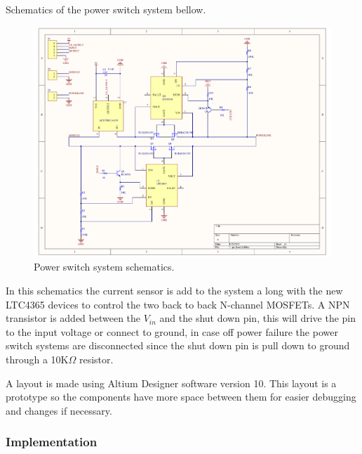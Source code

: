 Schematics of the power switch system bellow.
\begin{figure}[H]
	\begin{centering}
		\includegraphics[width=1.0\textwidth]{images/PS_PCB.pdf}
		\caption{Power switch system schematics.}
	\end{centering}
\end{figure}
In this schematics the current sensor is add to the system a long with the new LTC4365 devices to control the two back to back N-channel MOSFETs. A NPN transistor is added between the $ V_{in} $ and the shut down pin, this will drive the pin to the input voltage or connect to ground, in case off power failure the power switch systems are disconnected since the shut down pin is pull down to ground through a 10K$ \Omega $ resistor.

A layout is made using Altium Designer software version 10. This layout is a prototype so the components have more space between them for easier debugging and changes if necessary.
\begin{figure}[H]
	\begin{centering}
	\end{centering}
\end{figure}



\subsubsection{Implementation}
%
%
